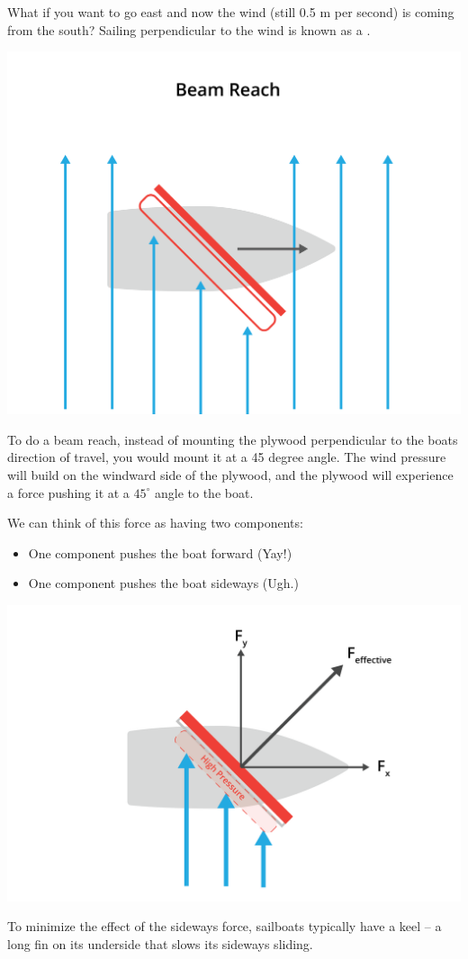 What if you want to go east and now the wind (still 0.5 m per second) is coming from the south?  Sailing perpendicular to the wind is known as a .

\includegraphics[width=.75\textwidth]{beamReach.png}


To do a beam reach,  instead of mounting the plywood perpendicular to the boats direction of travel,  you would mount it at a 45 degree angle.   The wind pressure will build on the windward
side of the plywood,  and the plywood will experience a force pushing it at a $45^\circ$ angle to the boat.

We can think of this force as having two components: 
\begin{itemize}
\item One component pushes the boat forward (Yay!)
\item One component pushes the boat sideways (Ugh.)
\end{itemize}
\includegraphics[width=.75\textwidth]{pressure.png}

To minimize the effect of the sideways force,  sailboats typically have  a keel -- a long fin on its underside that slows its sideways sliding.

